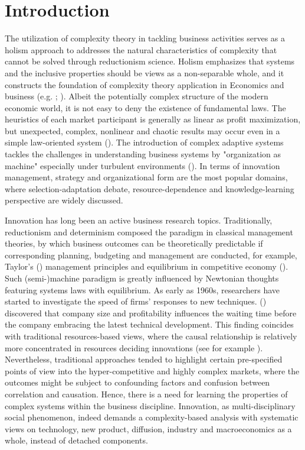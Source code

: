 \documentclass[utf8,english]{gradu3}
\begin{document}
\mainmatter

\chapter{Introduction}

The utilization of complexity theory in tackling business activities serves as a holism approach to addresses the natural characteristics of complexity that cannot be solved through reductionism science. Holism emphasizes that systems and the inclusive properties should be views as a non-separable whole, and it constructs the foundation of complexity theory application in Economics and business (e.g. \cite{smuts1926holism}; \cite{auyang1999foundations}). Albeit the potentially complex structure of the modern economic world, it is not easy to deny the existence of fundamental laws. The heuristics of each market participant is generally as linear as profit maximization, but unexpected, complex, nonlinear and chaotic results may occur even in a simple law-oriented system (\cite{nicolis1995introduction}). The introduction of complex adaptive systems tackles the challenges in understanding business systems by "organization as machine" especially under turbulent environments (\cite{dooley1997complex}). In terms of innovation management, strategy and organizational form are the most popular domains, where selection-adaptation debate, resource-dependence and knowledge-learning perspective are widely discussed. 

 Innovation has long been an active business research topics. Traditionally, reductionism and determinism composed the paradigm in classical management theories, by which business outcomes can be theoretically predictable if corresponding planning, budgeting and management are conducted, for example, Taylor's (\citeyear{taylor1911shop}) management principles and equilibrium in competitive economy (\cite{arrow1954existence}). Such (semi-)machine paradigm is greatly influenced by Newtonian thoughts featuring systems laws with equilibrium. As early as 1960s, researchers have started to investigate the speed of firms' responses to new techniques. \citeauthor{mansfield1963speed} (\citeyear{mansfield1963speed}) discovered that company size and profitability influences the waiting time before the company embracing the latest technical development. This finding coincides with traditional resources-based views, where the causal relationship is relatively more concentrated in resources deciding innovations (see for example \cite{wernerfelt1984resource}). Nevertheless, traditional approaches tended to highlight certain pre-specified points of view into the hyper-competitive and highly complex markets, where the outcomes might be subject to confounding factors and confusion between correlation and causation. Hence, there is a need for learning the properties of complex systems within the business discipline. Innovation, as multi-disciplinary social phenomenon, indeed demands a complexity-based analysis with systematic views on technology, new product, diffusion, industry and macroeconomics as a whole, instead of detached components.
\end{document}
